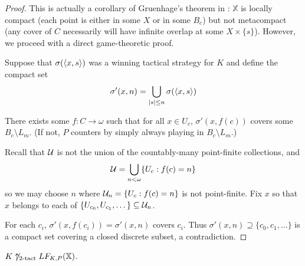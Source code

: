 \begin{proof}
This is actually a corollary of Gruenhage's theorem in \cite{G2}: $\mathbb{X}$ is locally compact (each point is either in some $X$ or in some $B_c$) but not metacompact (any cover of $C$ necessarily will have infinite overlap at some $X \times \{s\}$). However, we proceed with a direct game-theoretic proof.

Suppose that $\sigma(\langle x,s\rangle)$ was a winning tactical strategy for $K$ and define the compact set 
  \[
    \sigma'(x,n) = \bigcup_{|s|\leq n} \sigma(\langle x,s\rangle)
  \]

There exists some $f: C \to \omega$ such that for all $x\in U_c$, $\sigma'(x,f(c))$ covers some $B_c \setminus L_m$. (If not, $P$ counters by simply always playing in $B_c \setminus L_m$.)

Recall that $\mathcal{U}$ is not the union of the countably-many point-finite collections, and 
  \[
    \mathcal{U} = \bigcup_{n<\omega} \{U_c : f(c) = n\}
  \]
so we may choose $n$ where $\mathcal{U}_n = \{U_c : f(c) = n\}$ is not point-finite. Fix $x$ so that $x$ belongs to each of $\{U_{c_0},U_{c_1},\dots\} \subseteq \mathcal{U}_n$.

For each $c_i$, $\sigma'(x,f(c_i))=\sigma'(x,n)$ covers $c_i$. Thus $\sigma'(x,n) \supseteq \{c_0,c_1,\dots\}$ is a compact set covering a closed discrete subset, a contradiction.
\end{proof}

\begin{theorem}
$K\not\uparrow_{2\text{-tact}}LF_{K,P}(\mathbb{X})$.
\end{theorem}


